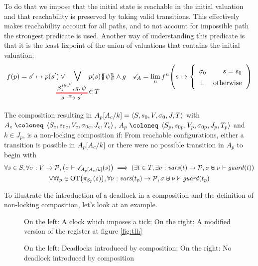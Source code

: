 \documentclass{article}
\begin{document}
To do that we impose that the initial state is reachable in the initial valuation and that reachability is preserved by taking valid transitions.
This effectively makes reachability account for all paths, and to not account for impossible path the strongest predicate is used.
Another way of understanding this predicate is that it is the least fixpoint of the union of valuations that contains the initial valuation:
\begin{align*}
	f\mpar{p} = s' \mapsto p\mpar{s'} \vee \bigsymb{\bigvee_\subbox{\OTg \,\in\, T}} p\mpar{s}\psubst{\psi} \wedge g &&
	\reach{A} = \lim_n f^n\mpar{s \mapsto \choice{\sigma_0 & s = s_0 \\ \bot & \text{otherwise}}}
\end{align*}

\begin{defi}
The composition resulting in \(A_p{\left[A_c\middle/k\right]} = \left<S,s_0,V,\sigma_0,J,T\right>\) with \(A_c \defobject \OA{S_c}{s_{0c}}{V_c}{\sigma_{0c}}{J_c}{T_c}\), \(A_p \defobject \OA{S_p}{s_{0p}}{V_p}{\sigma_{0p}}{J_p}{T_p}\) and \(k \in J_p\), is a non-locking composition if:
 From reachable configurations, either a transition is possible in \(A_p{\left[A_c\middle/k\right]}\) or there were no possible transition in \(A_p\) to begin with
\begin{multline*}
	\forall s \in S, \forall \sigma: V \to \mathcal{P}, {\left(\sigma \vdash \checkmark_{\!\! A_p{\left[A_c\middle/k\right]}}{\left(s\right)}\right)} \implies {\left(\exists t \in T, \exists \nu: \mathit{vars}{\left(t\right)} \to \mathcal{P}, \sigma \uplus \nu \vdash \mathit{guard}{\left(t\right)}\right)} \\
	\vee \forall t_p \in \mathrm{OT}{\left(\pi_{S_p}{\left(s\right)}\right)}, \forall \nu: \mathit{vars}{\left(t_p\right)} \to \mathcal{P}, \sigma \uplus \nu \nvdash \mathit{guard}{\left(t_p\right)}
\end{multline*}
\end{defi}

To illustrate the introduction of a deadlock in a composition and the definition of non-locking composition, let's look at an example.
\begin{exi}
\begin{figure}

\vrule

\caption{On the left: A clock which imposes a tick; On the right: A modified version of the register at figure \ref{fig:tlh}}
\label{fig:anytick}
\end{figure}
\begin{figure}

\vrule

\caption{On the left: Deadlocks introduced by composition; On the right: No deadlock introduced by composition}
\label{fig:deadlock}
\end{figure}
\end{exi}
\end{document}
